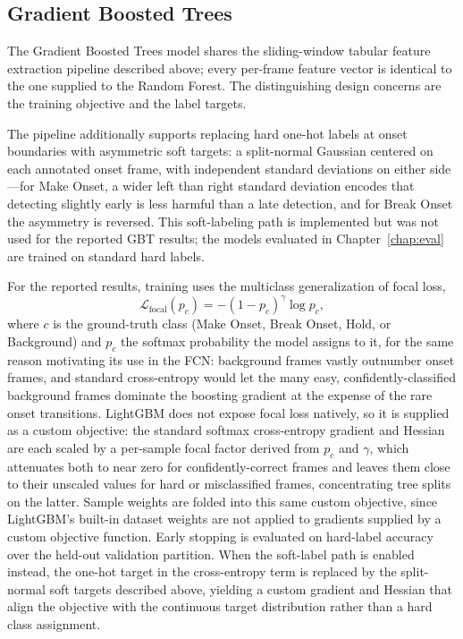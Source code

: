 \subsection{Gradient Boosted Trees}
The Gradient Boosted Trees model shares the sliding-window tabular feature extraction pipeline described above; every per-frame feature vector is identical to the one supplied to the Random Forest. The distinguishing design concerns are the training objective and the label targets.

The pipeline additionally supports replacing hard one-hot labels at onset boundaries with asymmetric soft targets: a split-normal Gaussian centered on each annotated onset frame, with independent standard deviations on either side---for Make Onset, a wider left than right standard deviation encodes that detecting slightly early is less harmful than a late detection, and for Break Onset the asymmetry is reversed. This soft-labeling path is implemented but was not used for the reported GBT results; the models evaluated in Chapter~\ref{chap:eval} are trained on standard hard labels.

For the reported results, training uses the multiclass generalization of focal loss,
\[
  \mathcal{L}_{\text{focal}}(p_c) = -(1 - p_c)^{\gamma}\log p_c,
\]
where $c$ is the ground-truth class (Make Onset, Break Onset, Hold, or Background) and $p_c$ the softmax probability the model assigns to it, for the same reason motivating its use in the FCN: background frames vastly outnumber onset frames, and standard cross-entropy would let the many easy, confidently-classified background frames dominate the boosting gradient at the expense of the rare onset transitions. LightGBM does not expose focal loss natively, so it is supplied as a custom objective: the standard softmax cross-entropy gradient and Hessian are each scaled by a per-sample focal factor derived from $p_c$ and $\gamma$, which attenuates both to near zero for confidently-correct frames and leaves them close to their unscaled values for hard or misclassified frames, concentrating tree splits on the latter. Sample weights are folded into this same custom objective, since LightGBM's built-in dataset weights are not applied to gradients supplied by a custom objective function. Early stopping is evaluated on hard-label accuracy over the held-out validation partition. When the soft-label path is enabled instead, the one-hot target in the cross-entropy term is replaced by the split-normal soft targets described above, yielding a custom gradient and Hessian that align the objective with the continuous target distribution rather than a hard class assignment.

